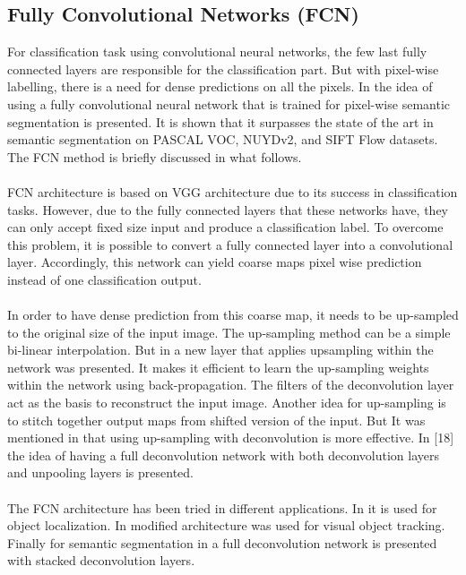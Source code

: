 \documentclass{article}
\begin{document}
\subsection{Fully Convolutional Networks (FCN)}
\label{fully_convolutional_networks}
For classification task using convolutional neural networks, the few last fully connected layers
are responsible for the classification part. But with pixel-wise labelling, there is a need for dense predictions on all the pixels. In \cite{deepSeg2015} the idea of using a fully convolutional neural network that is trained for pixel-wise semantic segmentation is presented. It is shown that it surpasses the state of the art in semantic segmentation on PASCAL VOC, NUYDv2, and SIFT Flow datasets. The FCN method is briefly discussed in what follows.
\\\\
FCN architecture is based on VGG \cite{deepConv2014} architecture due to its success in classification tasks. However, due to the fully connected layers that these networks have, they can only accept fixed size input and produce a classification label. To overcome this problem, it is possible to convert a fully connected layer into a convolutional layer. Accordingly, this network can yield coarse maps pixel wise prediction instead of one classification output.
\\\\
In order to have dense prediction from this coarse map, it needs to be up-sampled to the original size of the input image. The up-sampling method can be a simple bi-linear interpolation. But in \cite{deepSeg2015} a new layer that applies upsampling within the network was presented. It makes it efficient to learn the up-sampling weights within the network using back-propagation. The filters of the deconvolution layer act as the basis to reconstruct the input image. Another idea for up-sampling is to stitch together output maps from shifted version of the input. But It was mentioned in \cite{deepSeg2015} that using up-sampling with deconvolution is more effective. In [18] the idea of having a full deconvolution network with both deconvolution layers and unpooling layers is presented.
\\\\
The FCN architecture has been tried in different applications. In \cite{densebox2015} it is used for object localization. In \cite{track2015} modified architecture was used for visual object tracking. Finally for semantic segmentation in \cite{deconv2015} a full deconvolution network is presented with stacked deconvolution layers.
\end{document}
